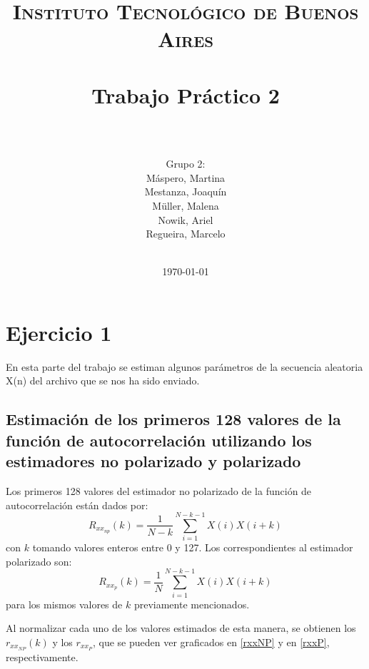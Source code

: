 





\title{
	\normalfont \normalsize \textsc{Instituto Tecnológico de Buenos Aires} \\ [25pt]
	\horrule{2pt} \\[0.4cm]
	\huge Trabajo Pr\'actico 2\\
	\horrule{2pt} \\[0cm]
\author{Grupo 2:\\M\'aspero, Martina \\Mestanza, Joaqu\'in\\ Müller, Malena\\Nowik, Ariel\\Regueira, Marcelo\\ \\ }
}
\date{\today} 

\maketitle
\newpage

\section*{Ejercicio 1}

En esta parte del trabajo se estiman algunos par\'ametros de la secuencia aleatoria X(n) del archivo que se nos ha sido enviado.

\subsection{Estimaci\'on de los primeros 128 valores de la funci\'on de autocorrelaci\'on utilizando los estimadores no polarizado y polarizado}

Los primeros 128 valores del estimador no polarizado de la funci\'on de autocorrelaci\'on est\'an dados por:
$$R_{xx_{np}}(k) = \frac{1}{N - k} \sum_{i=1}^{N-k-1}X(i)X(i+k)$$
con $k$ tomando valores enteros entre 0 y 127. Los correspondientes al estimador polarizado son:
$$R_{xx_{p}}(k) = \frac{1}{N} \sum_{i=1}^{N-k-1}X(i)X(i+k)$$
para los mismos valores de $k$ previamente mencionados.

Al normalizar cada uno de los valores estimados de esta manera,  se obtienen los $r_{xx_{NP}}(k)$ y los $r_{xx_{P}}$, que se pueden ver graficados en \ref{rxxNP} y en \ref{rxxP}, respectivamente.

